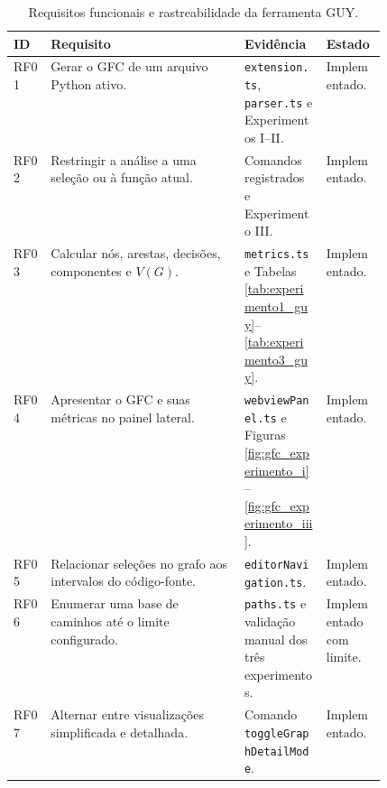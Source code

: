 \begin{table}[H]
    \centering
    \small
    \caption{Requisitos funcionais e rastreabilidade da ferramenta GUY.}
    \begin{tabularx}{\linewidth}{p{0.10\linewidth} X p{0.22\linewidth} p{0.16\linewidth}}
        \hline
        \textbf{ID} & \textbf{Requisito} & \textbf{Evidência} & \textbf{Estado} \\ \hline
        RF01 & Gerar o GFC de um arquivo Python ativo. & \texttt{extension.ts}, \texttt{parser.ts} e Experimentos I--II. & Implementado. \\ \hline
        RF02 & Restringir a análise a uma seleção ou à função atual. & Comandos registrados e Experimento III. & Implementado. \\ \hline
        RF03 & Calcular nós, arestas, decisões, componentes e \(V(G)\). & \texttt{metrics.ts} e Tabelas \ref{tab:experimento1_guy}--\ref{tab:experimento3_guy}. & Implementado. \\ \hline
        RF04 & Apresentar o GFC e suas métricas no painel lateral. & \texttt{webviewPanel.ts} e Figuras \ref{fig:gfc_experimento_i}--\ref{fig:gfc_experimento_iii}. & Implementado. \\ \hline
        RF05 & Relacionar seleções no grafo aos intervalos do código-fonte. & \texttt{editorNavigation.ts}. & Implementado. \\ \hline
        RF06 & Enumerar uma base de caminhos até o limite configurado. & \texttt{paths.ts} e validação manual dos três experimentos. & Implementado com limite. \\ \hline
        RF07 & Alternar entre visualizações simplificada e detalhada. & Comando \texttt{toggleGraphDetailMode}. & Implementado. \\ \hline
    \end{tabularx}
    \label{tab:requisitos_funcionais_guy}
\end{table}

